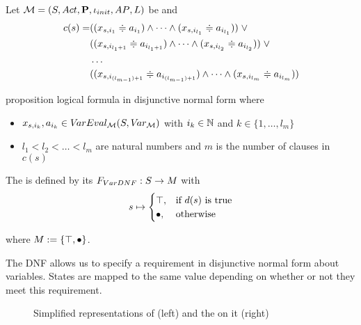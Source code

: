 \documentclass[preview]{standalone}
\begin{document}
\begin{definition}
	Let $\chgph = \chgphtuple$ be \achgphN and 
	\begin{align*}
		c(s) = &((\varstate[,i_1] \eqorneq \varval_{i_1}) \land \dots \land (\varstate[,i_{l_1}] \eqorneq \varval_{i_{l_1}})) \; \lor \\
		&((\varstate[,i_{l_1+1}] \eqorneq \varval_{i_{l_1+1}}) \land \dots \land (\varstate[,i_{l_2}] \eqorneq \varval_{i_{l_2}})) \; \lor  \\
		&\dots \\ 
		&((\varstate[,i_{(l_{m-1})+1}] \eqorneq \varval_{i_{(l_{m-1})+1}}) \land \dots \land (\varstate[,i_{l_m}]  \eqorneq \varval_{i_{l_m}}))
	\end{align*}
	
	proposition logical formula in disjunctive normal form where
	\begin{itemize}
		\item $\varstate[,i_k], a_{i_k} \in \varevalimg$ with $i_k\in \natnums$ and $k \in \{1, \dots, l_m\}$
		\item $l_1 < l_2 < \dots < l_m$ are natural numbers and $m$ is the number of clauses in $c(s)$
	\end{itemize}		
	The \viewN \viewparamdnf is defined by its \grpfctN $\gfctparamdnf : \states \to \imggrp$ with
	\[
	\state \mapsto
	\begin{cases}
			\group, &\text{if } d(s) \text{ is true}\\
			\remelem, 	&\text{otherwise}
		\end{cases}
	\]
	
	where $\imggrp := \{\group, \remelem\}$.
\end{definition}


The DNF allows us to specify a requirement in disjunctive normal form about variables. States are mapped to the same value depending on whether or not they meet this requirement.


\begin{figure}[h]
	\begin{minipage}{.6\textwidth}
		
	\end{minipage}%
	\begin{minipage}{.5\textwidth}
		
	\end{minipage}
	\caption{Simplified representations of \mdp (left) and the \viewN \viewparamdnf on it (right)}
	\label{fig:varsDnf}  
\end{figure}
\end{document}
